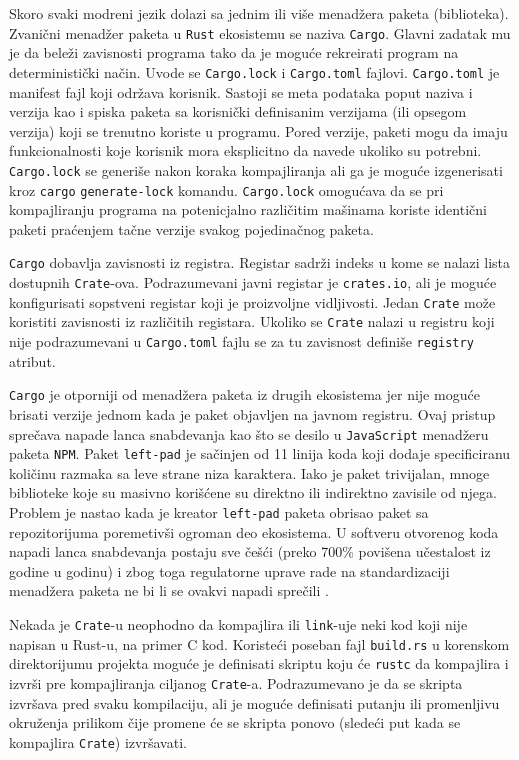 \documentclass[11pt]{article}
\begin{document}
Skoro svaki modreni jezik dolazi sa jednim ili više menadžera paketa (biblioteka). Zvanični menadžer paketa u \verb|Rust|
ekosistemu se naziva \verb|Cargo|. Glavni zadatak mu je da beleži zavisnosti programa tako da je moguće rekreirati 
program na deterministički način. Uvode se \verb|Cargo.lock| i \verb|Cargo.toml|
fajlovi. \verb|Cargo.toml| je manifest fajl koji održava korisnik. Sastoji se meta podataka poput naziva i verzija kao i spiska paketa sa korisnički definisanim 
verzijama (ili opsegom verzija) koji se trenutno koriste u programu. Pored verzije, paketi mogu da imaju funkcionalnosti koje korisnik mora eksplicitno da navede ukoliko su potrebni.
\verb|Cargo.lock| se generiše nakon koraka kompajliranja ali ga je moguće izgenerisati kroz \verb|cargo| \verb|generate-lock| komandu.
\verb|Cargo.lock| omogućava da se pri kompajliranju programa na potenicjalno različitim mašinama koriste identični paketi praćenjem tačne verzije svakog pojedinačnog paketa.

\verb|Cargo| dobavlja zavisnosti iz registra. Registar sadrži indeks u kome se nalazi lista dostupnih \verb|Crate|-ova. Podrazumevani javni registar je \verb|crates.io|, ali je moguće 
konfigurisati sopstveni registar koji je proizvoljne vidljivosti. Jedan \verb|Crate| može koristiti zavisnosti iz različitih registara. Ukoliko se \verb|Crate| nalazi u registru koji nije 
podrazumevani u \verb|Cargo.toml| fajlu se za tu zavisnost definiše \verb|registry| atribut.

\verb|Cargo| je otporniji od menadžera paketa iz drugih ekosistema jer nije moguće brisati verzije jednom kada je paket objavljen na javnom registru. 
Ovaj pristup sprečava napade lanca snabdevanja kao što se desilo u \verb|JavaScript| menadžeru paketa \verb|NPM|. Paket \verb|left-pad| 
je sačinjen od 11 linija koda koji dodaje specificiranu količinu razmaka sa leve strane niza karaktera. Iako je paket trivijalan, mnoge biblioteke koje 
su masivno korišćene su direktno ili indirektno zavisile od njega. Problem je nastao kada je kreator \verb|left-pad| paketa obrisao 
paket sa repozitorijuma poremetivši ogroman deo ekosistema. U softveru otvorenog koda napadi lanca snabdevanja postaju sve češći (preko 700\% povišena učestalost
iz godine u godinu) i zbog toga regulatorne uprave rade na standardizaciji menadžera paketa ne bi li se ovakvi napadi sprečili \cite{supply-chain}.

Nekada je \verb|Crate|-u neophodno da kompajlira ili \verb|link|-uje neki kod koji nije napisan u Rust-u, na primer C kod. Koristeći poseban fajl \verb|build.rs| u korenskom direktorijumu 
projekta moguće je definisati skriptu koju će \verb|rustc| da kompajlira i izvrši pre kompajliranja ciljanog \verb|Crate|-a. Podrazumevano je da se skripta izvršava pred svaku kompilaciju,
ali je moguće definisati putanju ili promenljivu okruženja prilikom čije promene će se skripta ponovo (sledeći put kada se kompajlira \verb|Crate|) izvršavati.
\end{document}
